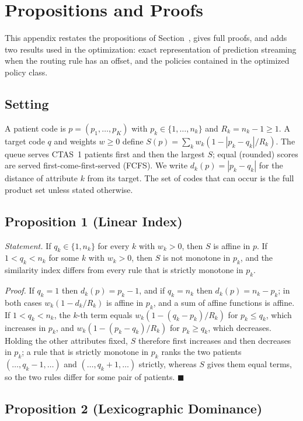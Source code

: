 \section{Propositions and Proofs}
\label{app:proofs}

This appendix restates the propositions of Section~, gives full proofs, and adds two results used in the optimization: exact representation of prediction streaming when the routing rule has an offset, and the policies contained in the optimized policy class.

\subsection{Setting}

A patient code is $p=(p_1,\dots,p_K)$ with $p_k\in\{1,\dots,n_k\}$ and $R_k=n_k-1\geq 1$. A target code $q$ and weights $w\geq0$ define $S(p)=\sum_k w_k(1-|p_k-q_k|/R_k)$. The queue serves CTAS~1 patients first and then the largest $S$; equal (rounded) scores are served first-come-first-served (FCFS). We write $d_k(p)=|p_k-q_k|$ for the distance of attribute $k$ from its target. The set of codes that can occur is the full product set unless stated otherwise.

\subsection{Proposition 1 (Linear Index)}

\emph{Statement.} If $q_k\in\{1,n_k\}$ for every $k$ with $w_k>0$, then $S$ is affine in $p$. If $1<q_k<n_k$ for some $k$ with $w_k>0$, then $S$ is not monotone in $p_k$, and the similarity index differs from every rule that is strictly monotone in $p_k$.

\emph{Proof.} If $q_k=1$ then $d_k(p)=p_k-1$, and if $q_k=n_k$ then $d_k(p)=n_k-p_k$; in both cases $w_k(1-d_k/R_k)$ is affine in $p_k$, and a sum of affine functions is affine. If $1<q_k<n_k$, the $k$-th term equals $w_k(1-(q_k-p_k)/R_k)$ for $p_k\le q_k$, which increases in $p_k$, and $w_k(1-(p_k-q_k)/R_k)$ for $p_k\ge q_k$, which decreases. Holding the other attributes fixed, $S$ therefore first increases and then decreases in $p_k$; a rule that is strictly monotone in $p_k$ ranks the two patients $(\dots,q_k-1,\dots)$ and $(\dots,q_k+1,\dots)$ strictly, whereas $S$ gives them equal terms, so the two rules differ for some pair of patients. \hfill$\blacksquare$

\subsection{Proposition 2 (Lexicographic Dominance)}

